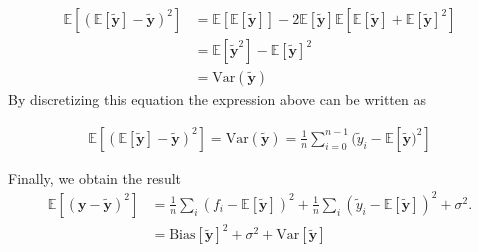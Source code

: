 \begin{align*}
    \mathbb{E}[(\mathbb{E}[\mathbf{\tilde{y}}]-\mathbf{\tilde{y}})^2] &=\mathbb{E}[\mathbb{E}[\mathbf{\tilde{y}}]]-2\mathbb{E}[\mathbf{\tilde{y}}]\mathbb{E}[\mathbb{E}[\mathbf{\tilde{y}}]+\mathbb{E}[\mathbf{\tilde{y}}]^2]\\
    &=\mathbb{E}[\mathbf{\tilde{y}}^2]-\mathbb{E}[\mathbf{\tilde{y}}]^2\\
    &=\mathrm{Var}(\mathbf{\tilde{y}})
\end{align*} By discretizing this equation the expression above can be written as

\begin{align*}
    \mathbb{E}[(\mathbb{E}[\mathbf{\tilde{y}}]-\mathbf{\tilde{y}})^2]=\mathrm{Var}(\mathbf{\tilde{y}})=\frac{1}{n}\sum_{i=0}^{n-1}(\tilde{y}_i-\mathbb{E}[\mathbf{\tilde{y}})^2]
\end{align*}


Finally, we obtain the result
\begin{align}
    \mathbb{E}\left[(\mathbf{y}-\mathbf{\tilde{y}})^2\right]&=\frac{1}{n}\sum_i(f_i-\mathbb{E}\left[\mathbf{\tilde{y}}\right])^2+\frac{1}{n}\sum_i(\tilde{y}_i-\mathbb{E}\left[\mathbf{\tilde{y}}\right])^2+\sigma^2.\\
    &=\mathrm{Bias}[\mathbf{\tilde{y}}]^2+\sigma^2+\mathrm{Var}[\mathbf{\tilde{y}}]
\end{align}



